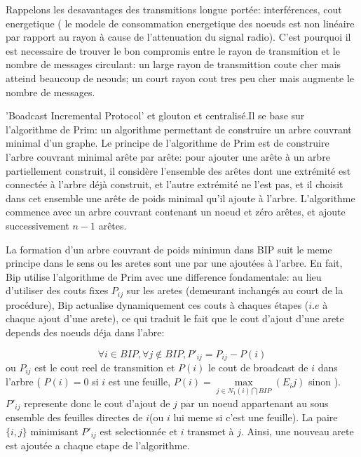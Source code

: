   Rappelons les desavantages des transmitions longue portée: interférences, cout energetique ( le modele de consommation energetique des noeuds est non linéaire par rapport au rayon à cause de l'attenuation du signal radio).
C'est pourquoi il est necessaire de trouver le bon compromis entre le rayon de transmition et le nombre de messages circulant: un large rayon de transmittion coute cher mais atteind beaucoup de neouds; un court rayon cout tres peu cher mais 
augmente le nombre de messages. 

'Boadcast Incremental Protocol' et glouton et centralisé.Il se base sur l'algorithme de Prim: un algorithme permettant de construire un arbre couvrant minimal d'un graphe. Le principe de l'algorithme de Prim est de construire l'arbre couvrant minimal arête par arête: pour ajouter une 
arête à un arbre partiellement construit, il considère l'ensemble des arêtes dont une extrémité est
connectée à l'arbre déjà construit, et l'autre extrémité ne l'est pas, et
il choisit dans cet ensemble une arête de poids minimal qu'il ajoute à l'arbre. L'algorithme commence avec un arbre couvrant contenant un noeud et zéro arêtes, et ajoute successivement $n-1$ arêtes.

La formation d'un arbre couvrant de poids minimun dans BIP suit le meme principe dans le sens ou les aretes sont une par une ajoutées à l'arbre.
En fait, Bip utilise l'algorithme de Prim avec une difference fondamentale: au lieu d'utiliser des couts fixes $P_{ij}$ sur les aretes (demeurant inchangés au court de la procédure),
Bip actualise dynamiquement ces couts à chaques étapes ($i.e$ à chaque ajout d'une arete), ce qui traduit le fait que le cout d'ajout d'une arete depends des noeuds déja dans l'abre:

$$ \forall i \in BIP, \forall j \notin BIP, P'_{ij}=P_{ij}-P(i)$$
ou $P_{ij}$ est le cout reel de transmition et $P(i)$ le cout de broadcast de $i$ dans l'arbre ( $P(i)=0$ si $i$ est une feuille, $P(i)=\max\limits_{j\in N_1(i)\bigcap BIP}(E_ij)$ sinon ). $P'_{ij}$ represente donc le cout d'ajout de $j$ par un noeud appartenant au sous ensemble des feuilles
directes de $i$(ou $i$ lui meme si c'est une feuille). La paire $\{i,j\}$ minimisant $P'_{ij}$ est selectionnée et $i$ transmet à $j$. Ainsi, une nouveau arete est ajoutée a chaque etape de l'algorithme.\\



